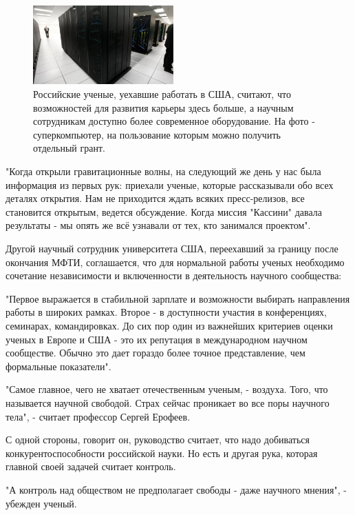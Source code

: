 \begin{figure}
    \begin{center}
        \includegraphics[width=0.48\textwidth]{img/supercomputer.png}
    \end{center}
    \caption{Российские ученые, уехавшие работать в США, считают, что возможностей для развития карьеры здесь больше, а научным сотрудникам доступно более современное оборудование. На фото - суперкомпьютер, на пользование которым можно получить отдельный грант.}
\end{figure}
"Когда открыли гравитационные волны, на следующий же день у нас была информация из первых рук: приехали ученые, которые рассказывали обо всех деталях открытия. Нам не приходится ждать всяких пресс-релизов, все становится открытым, ведется обсуждение. Когда миссия "Кассини" давала результаты - мы опять же всё узнавали от тех, кто занимался проектом".

Другой научный сотрудник университета США, переехавший за границу после окончания МФТИ, соглашается, что для нормальной работы ученых необходимо сочетание независимости и включенности в деятельность научного сообщества:


"Первое выражается в стабильной зарплате и возможности выбирать направления работы в широких рамках. Второе - в доступности участия в конференциях, семинарах, командировках. До сих пор один из важнейших критериев оценки ученых в Европе и США - это их репутация в международном научном сообществе. Обычно это дает гораздо более точное представление, чем формальные показатели".

"Самое главное, чего не хватает отечественным ученым, - воздуха. Того, что называется научной свободой. Страх сейчас проникает во все поры научного тела", - считает профессор Сергей Ерофеев.

С одной стороны, говорит он, руководство считает, что надо добиваться конкурентоспособности российской науки. Но есть и другая рука, которая главной своей задачей считает контроль.

"А контроль над обществом не предполагает свободы - даже научного мнения", - убежден ученый.


